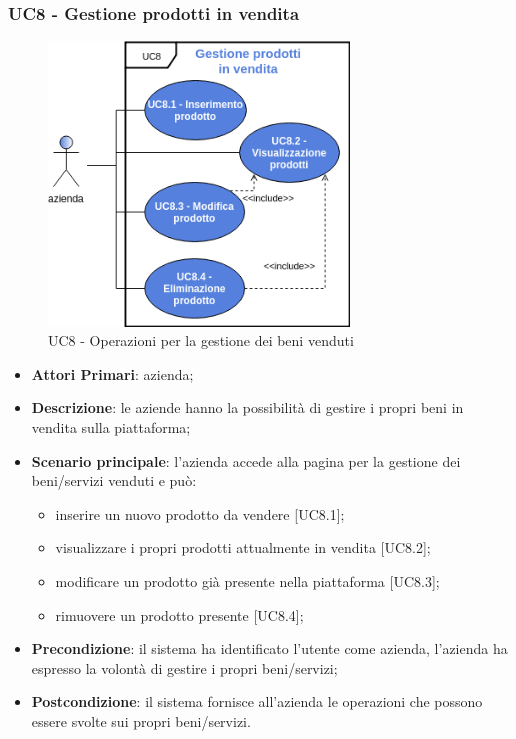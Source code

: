 \subsubsection{UC8 - Gestione prodotti in vendita}
\begin{figure}[h]
	\includegraphics[width=8cm]{res/images/UC8-Generale.png}
	\centering
	\caption{UC8 - Operazioni per la gestione dei beni venduti}
\end{figure}
\begin{itemize}
	\item \textbf{Attori Primari}: azienda;
	\item \textbf{Descrizione}: le aziende hanno la possibilità di gestire i propri beni in vendita sulla piattaforma;
	\item \textbf{Scenario principale}: l'azienda accede alla pagina per la gestione dei beni/servizi venduti e può:
	\begin{itemize}
		\item inserire un nuovo prodotto da vendere [UC8.1];
		\item visualizzare i propri prodotti attualmente in vendita [UC8.2];
		\item modificare un prodotto già presente nella piattaforma [UC8.3];
		\item rimuovere un prodotto presente [UC8.4]; 
	\end{itemize}
	\item \textbf{Precondizione}: il sistema ha identificato l'utente come azienda, l'azienda ha espresso la volontà di gestire i propri beni/servizi;
	\item \textbf{Postcondizione}: il sistema fornisce all'azienda le operazioni che possono essere svolte sui propri beni/servizi.	
\end{itemize}

